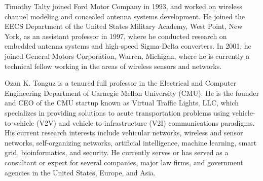 \documentclass[12pt, draftclsnofoot, onecolumn]{IEEEtran}
\begin{document}
\begin{IEEEbiographynophoto}{Timothy Talty}
	joined Ford Motor Company in 1993, and worked on wireless channel modeling and concealed antenna systems development. He joined the EECS Department of the United States Military Academy, West Point, New York, as an assistant professor in 1997, where he conducted research on embedded antenna systems and high-speed Sigma-Delta converters. In 2001, he joined General Motors Corporation, Warren, Michigan, where he is currently a technical fellow working in the areas of wireless sensors and networks.
\end{IEEEbiographynophoto}


\begin{IEEEbiographynophoto}{Ozan K. Tonguz}
	is a tenured full professor in the Electrical and Computer Engineering Department of Carnegie Mellon University (CMU). He is the founder and CEO of the CMU startup known as Virtual Traffic Lights, LLC, which specializes in providing solutions to acute transportation problems using vehicle-to-vehicle (V2V) and vehicle-to-infrastructure (V2I) communications paradigms. His current research interests include vehicular networks, wireless and sensor networks, self-organizing networks, artificial intelligence, machine learning, smart grid, bioinformatics, and security. He currently serves or has served as a consultant or expert for several companies, major law firms, and government agencies in the United States, Europe, and Asia.
\end{IEEEbiographynophoto}
\end{document}
